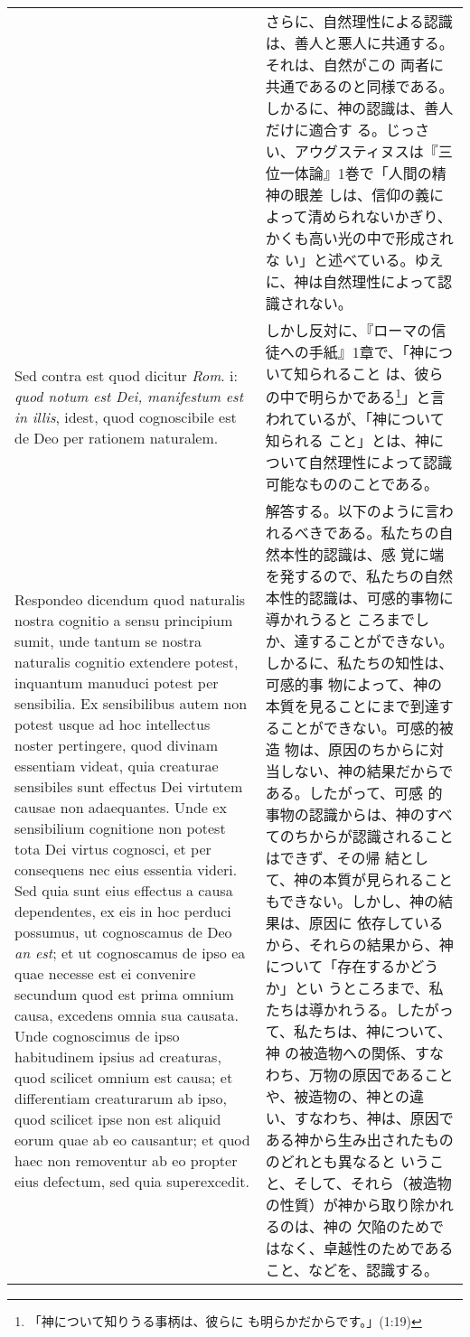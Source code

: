 \documentclass[10pt]{jsarticle} %
\begin{document}
\begin{longtable}{p{21em}p{21em}}
&

さらに、自然理性による認識は、善人と悪人に共通する。それは、自然がこの
両者に共通であるのと同様である。しかるに、神の認識は、善人だけに適合す
る。じっさい、アウグスティヌスは『三位一体論』1巻で「人間の精神の眼差
しは、信仰の義によって清められないかぎり、かくも高い光の中で形成されな
い」と述べている。ゆえに、神は自然理性によって認識されない。

\\


{\sc  Sed contra est} quod dicitur {\it Rom}. {\sc i}: {\it quod
 notum est Dei, manifestum est in illis}, idest, quod cognoscibile est
 de Deo per rationem naturalem.


&

しかし反対に、『ローマの信徒への手紙』1章で、「神について知られること
は、彼らの中で明らかである\footnote{「神について知りうる事柄は、彼らに
も明らかだからです。」(1:19)}」と言われているが、「神について知られる
こと」とは、神について自然理性によって認識可能なもののことである。


\\



{\sc  Respondeo dicendum} quod naturalis nostra cognitio a sensu
 principium sumit, unde tantum se nostra naturalis cognitio extendere
 potest, inquantum manuduci potest per sensibilia. Ex sensibilibus autem
 non potest usque ad hoc intellectus noster pertingere, quod divinam
 essentiam videat, quia creaturae sensibiles sunt effectus Dei virtutem
 causae non adaequantes. Unde ex sensibilium cognitione non potest tota
 Dei virtus cognosci, et per consequens nec eius essentia videri. Sed
 quia sunt eius effectus a causa dependentes, ex eis in hoc perduci
 possumus, ut cognoscamus de Deo {\it an est}; et ut cognoscamus de ipso ea
 quae necesse est ei convenire secundum quod est prima omnium causa,
 excedens omnia sua causata. Unde cognoscimus de ipso habitudinem ipsius
 ad creaturas, quod scilicet omnium est causa; et differentiam
 creaturarum ab ipso, quod scilicet ipse non est aliquid eorum quae ab
 eo causantur; et quod haec non removentur ab eo propter eius defectum,
 sed quia superexcedit.


&

解答する。以下のように言われるべきである。私たちの自然本性的認識は、感
覚に端を発するので、私たちの自然本性的認識は、可感的事物に導かれうると
ころまでしか、達することができない。しかるに、私たちの知性は、可感的事
物によって、神の本質を見ることにまで到達することができない。可感的被造
物は、原因のちからに対当しない、神の結果だからである。したがって、可感
的事物の認識からは、神のすべてのちからが認識されることはできず、その帰
結として、神の本質が見られることもできない。しかし、神の結果は、原因に
依存しているから、それらの結果から、神について「存在するかどうか」とい
うところまで、私たちは導かれうる。したがって、私たちは、神について、神
の被造物への関係、すなわち、万物の原因であることや、被造物の、神との違
い、すなわち、神は、原因である神から生み出されたもののどれとも異なると
いうこと、そして、それら（被造物の性質）が神から取り除かれるのは、神の
欠陥のためではなく、卓越性のためであること、などを、認識する。



\end{longtable}
\end{document}
